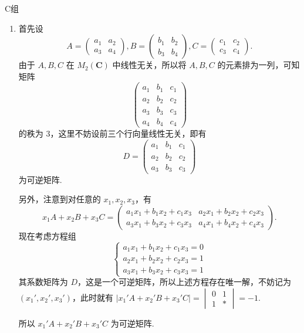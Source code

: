 \centerline{\heiti C组}
\begin{enumerate}
    \item 首先设
    \[A=\begin{pmatrix}a_1 & a_2 \\ a_3 & a_4\end{pmatrix},B=\begin{pmatrix}b_1 & b_2 \\ b_3 & b_4\end{pmatrix},C=\begin{pmatrix}c_1 & c_2 \\ c_3 & c_4\end{pmatrix}.\]
    由于 $A,B,C$ 在 $M_2(\mathbf{C})$ 中线性无关，所以将 $A,B,C$ 的元素排为一列，可知矩阵
    \[\begin{pmatrix}a_1 & b_1 & c_1 \\ a_2 & b_2 & c_2 \\ a_3 & b_3 & c_3 \\ a_4 & b_4 & c_4\end{pmatrix}\]
    的秩为 $3$，这里不妨设前三个行向量线性无关，即有
    \[D=\begin{pmatrix}a_1 & b_1 & c_1 \\ a_2 & b_2 & c_2 \\ a_3 & b_3 & c_3\end{pmatrix}\]
    为可逆矩阵.

    另外，注意到对任意的 $x_1,x_2,x_3$，有
    \[x_1A+x_2B+x_3C=\begin{pmatrix}a_1x_1+b_1x_2+c_1x_3 & a_2x_1+b_2x_2+c_2x_3 \\ a_3x_1+b_3x_2+c_3x_3 & a_4x_1+b_4x_2+c_4x_3\end{pmatrix}.\]
    现在考虑方程组
    \[\begin{cases}a_1x_1+b_1x_2+c_1x_3 = 0 \\ a_2x_1+b_2x_2+c_2x_3 = 1 \\ a_3x_1+b_3x_2+c_3x_3 = 1\end{cases}\]
    其系数矩阵为 $D$，这是一个可逆矩阵，所以上述方程存在唯一解，不妨记为 $(x_1',x_2',x_3')$，此时就有 $\lvert x_1'A+x_2'B+x_3'C \rvert = \begin{vmatrix}0 & 1 \\ 1 & \ast\end{vmatrix} = -1$.
    
    所以 $x_1'A+x_2'B+x_3'C$ 为可逆矩阵.
\end{enumerate}

\clearpage

